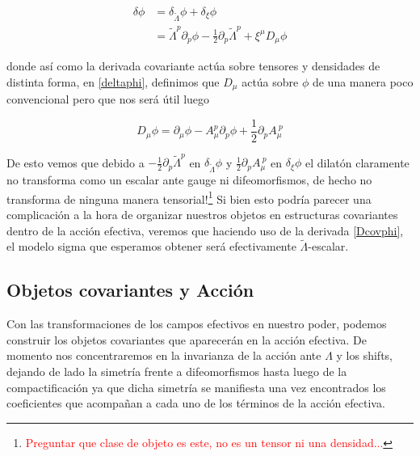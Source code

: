 \documentclass{article}
\numberwithin{equation}{section}
\begin{document}
\begin{boxquation}
\begin{equation}\label{deltaphi}
\begin{aligned}
\delta \phi &= \delta_{\widetilde{\Lambda}} \phi + \delta_{\xi} \phi\\
&= \widetilde{\Lambda}^p \partial_p \phi - \frac{1}{2} \partial_p \widetilde{\Lambda}^p + \xi^{\mu} D_{\mu} \phi 
\end{aligned}
\end{equation}
\end{boxquation}
 
donde así como la derivada covariante actúa sobre tensores y densidades de distinta forma, en \ref{deltaphi}, definimos que $ D_{\mu} $ actúa sobre $ \phi $ de una manera poco convencional pero que nos será útil luego

\begin{equation}\label{Dcovphi}
D_{\mu} \phi = \partial_{\mu} \phi - A_{\mu}^p \partial_p \phi + \frac{1}{2} \partial_p A_{\mu}^{\ p}
\end{equation}

De esto vemos que debido a $ - \frac{1}{2} \partial_p \widetilde{\Lambda}^p $ en $ \delta_{\widetilde{\Lambda}} \phi $ y $ \frac{1}{2} \partial_p A_{\mu}^{\ p} $ en $ \delta_{\xi} \phi $ el dilatón claramente no transforma como un escalar ante gauge ni difeomorfismos, de hecho no transforma de ninguna manera tensorial!\footnote{\textcolor{red}{Preguntar que clase de objeto es este, no es un tensor ni una densidad...}} Si bien esto podría parecer una complicación a la hora de organizar nuestros objetos en estructuras covariantes dentro de la acción efectiva, veremos que haciendo uso de la derivada \ref{Dcovphi}, el modelo sigma que esperamos obtener será efectivamente $ \widetilde{\Lambda}$-escalar. 



\subsection{\textcolor{teal!60!white}{Objetos covariantes y Acción}}\label{accion}

Con las transformaciones de los campos efectivos en nuestro poder, podemos construir los objetos covariantes que aparecerán en la acción efectiva. De momento nos concentraremos en la invarianza de la acción ante $ \Lambda $ y los shifts, dejando de lado la simetría frente a difeomorfismos hasta luego de la compactificación ya que dicha simetría se manifiesta una vez encontrados los coeficientes que acompañan a cada uno de los términos de la acción efectiva.
\end{document}
